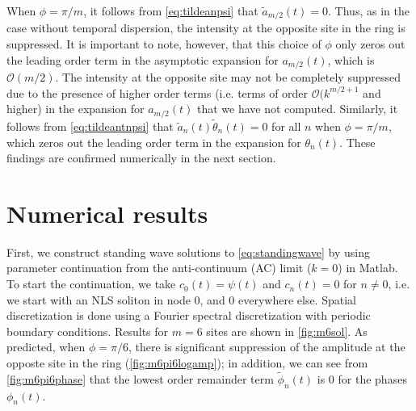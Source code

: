 \documentclass[11pt,reqno]{amsart}
\begin{document}
When $\phi = \pi/m$, it follows from \cref{eq:tildeanpsi} that $\tilde{a}_{m/2}(t) = 0$. Thus, as in the case without temporal dispersion, the intensity at the opposite site in the ring is suppressed. It is important to note, however, that this choice of $\phi$ only zeros out the leading order term in the asymptotic expansion for $a_{m/2}(t)$, which is $\mathcal{O}(m/2)$. The intensity at the opposite site may not be completely suppressed due to the presence of higher order terms (i.e. terms of order $\mathcal{O}(k^{m/2+1}$ and higher) in the expansion for $a_{m/2}(t)$ that we have not computed. Similarly, it follows from \cref{eq:tildeantnpsi} that $\tilde{a}_n(t) \tilde{\theta}_n(t) = 0$ for all $n$ when $\phi = \pi/m$, which zeros out the leading order term in the expansion for $\theta_n(t)$. These findings are confirmed numerically in the next section.


\section{Numerical results}\label{sec:numerics}

First, we construct standing wave solutions to \cref{eq:standingwave} by using parameter continuation from the anti-continuum (AC) limit ($k=0$) in Matlab. To start the continuation, we take $c_0(t) = \psi(t)$ and $c_n(t) = 0$ for $n \neq 0$, i.e. we start with an NLS soliton in node 0, and 0 everywhere else. Spatial discretization is done using a Fourier spectral discretization with periodic boundary conditions. Results for $m=6$ sites are shown in \cref{fig:m6sol}. As predicted, when $\phi=\pi/6$, there is significant suppression of the amplitude at the opposte site in the ring (\cref{fig:m6pi6logamp}); in addition, we can see from \cref{fig:m6pi6phase} that the lowest order remainder term $\tilde{\phi}_n(t)$ is 0 for the phases $\phi_n(t)$.
\end{document}
